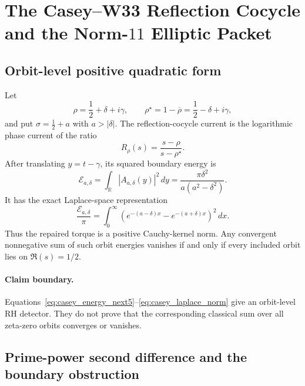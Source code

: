 
\section{The Casey--W33 Reflection Cocycle and the Norm-$11$ Elliptic Packet}
\label{sec:casey_w33_weil_elliptic}

\subsection{Orbit-level positive quadratic form}

Let
\[
 \rho=\frac12+\delta+i\gamma,
 \qquad
 \rho^{\star}=1-\overline\rho=\frac12-\delta+i\gamma,
\]
and put $\sigma=\frac12+a$ with $a>|\delta|$. The reflection-cocycle
current is the logarithmic phase current of the ratio
\[
 R_\rho(s)=\frac{s-\rho}{s-\rho^{\star}}.
\]
After translating $y=t-\gamma$, its squared boundary energy is
\begin{equation}
 \mathcal E_{a,\delta}
 =\int_{\mathbb R}|A_{a,\delta}(y)|^2\,dy
 =\frac{\pi\delta^2}{a(a^2-\delta^2)}.
 \label{eq:casey_energy_next5}
\end{equation}
It has the exact Laplace-space representation
\begin{equation}
 \frac{\mathcal E_{a,\delta}}{\pi}
 =\int_0^\infty
 \left(e^{-(a-\delta)x}-e^{-(a+\delta)x}\right)^2\,dx.
 \label{eq:casey_laplace_norm}
\end{equation}
Thus the repaired torque is a positive Cauchy-kernel norm. Any convergent
nonnegative sum of such orbit energies vanishes if and only if every included
orbit lies on $\Re(s)=1/2$.

\paragraph{Claim boundary.}
Equations~\eqref{eq:casey_energy_next5}--\eqref{eq:casey_laplace_norm} give an
orbit-level RH detector. They do not prove that the corresponding classical
sum over all zeta-zero orbits converges or vanishes.

\subsection{Prime-power second difference and the boundary obstruction}

